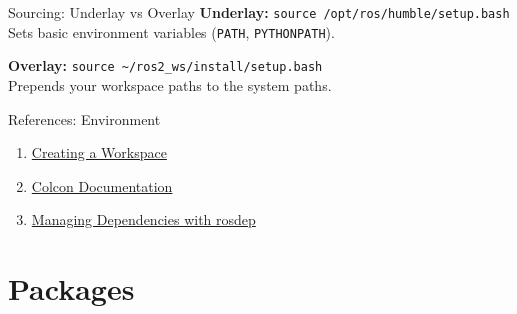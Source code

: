 \documentclass[aspectratio=169]{beamer}
\begin{document}
\begin{frame}{Sourcing: Underlay vs Overlay}
    \textbf{Underlay:}
    \texttt{source /opt/ros/humble/setup.bash}
    \\ Sets basic environment variables (\texttt{PATH}, \texttt{PYTHONPATH}).

    \vspace{0.5em}
    \textbf{Overlay:}
    \texttt{source \textasciitilde/ros2\_ws/install/setup.bash}
    \\ Prepends your workspace paths to the system paths.

    \begin{center}
    \end{center}
\end{frame}

\begin{frame}{References: Environment}
    \begin{enumerate}
        \item [EN] \href{https://docs.ros.org/en/humble/Tutorials/Beginner-Client-Libraries/Creating-A-Workspace/Creating-A-Workspace.html}{Creating a Workspace}
        \item [EN] \href{https://colcon.readthedocs.io/en/released/}{Colcon Documentation}
        \item [EN] \href{https://docs.ros.org/en/humble/Tutorials/Intermediate/Rosdep.html}{Managing Dependencies with rosdep}
    \end{enumerate}
\end{frame}

\section{Packages}
\end{document}
